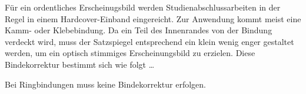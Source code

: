 Für ein ordentliches Erscheinugsbild werden Studienabschlussarbeiten in der
Regel in einem Hardcover-Einband eingereicht. Zur Anwendung kommt meist eine
Kamm- oder Klebebindung. Da ein Teil des Innenrandes von der Bindung verdeckt
wird, muss der Satzspiegel entsprechend ein klein wenig enger gestaltet werden,
um ein optisch stimmiges Erscheinungsbild zu erzielen. Diese Bindekorrektur
bestimmt sich wie folgt \dots




Bei Ringbindungen muss keine Bindekorrektur erfolgen.


